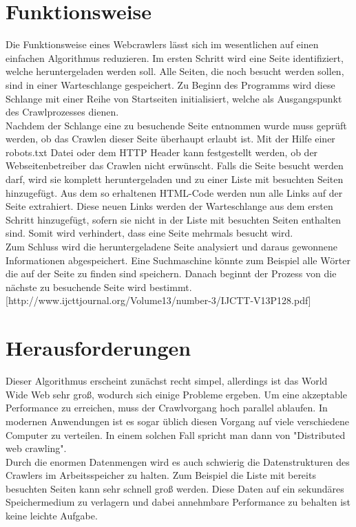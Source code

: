 \section{Funktionsweise}
Die Funktionsweise eines Webcrawlers lässt sich im wesentlichen auf einen einfachen Algorithmus reduzieren. Im ersten Schritt wird eine Seite identifiziert, welche heruntergeladen werden soll. Alle Seiten, die noch besucht werden sollen, sind in einer Warteschlange gespeichert. Zu Beginn des Programms wird diese Schlange mit einer Reihe von Startseiten initialisiert, welche als Ausgangspunkt des Crawlprozesses dienen.\\
Nachdem der Schlange eine zu besuchende Seite entnommen wurde muss geprüft werden, ob das Crawlen dieser Seite überhaupt erlaubt ist. Mit der Hilfe einer robots.txt Datei oder dem HTTP Header kann festgestellt werden, ob der Webseitenbetreiber das Crawlen nicht erwünscht.
Falls die Seite besucht werden darf, wird sie komplett heruntergeladen und zu einer Liste mit besuchten Seiten hinzugefügt. Aus dem so erhaltenen HTML-Code werden nun alle Links auf der Seite extrahiert. Diese neuen Links werden der Warteschlange aus dem ersten Schritt hinzugefügt, sofern sie nicht in der Liste mit besuchten Seiten enthalten sind. Somit wird verhindert, dass eine Seite mehrmals besucht wird. \\
Zum Schluss wird die heruntergeladene Seite analysiert und daraus gewonnene Informationen abgespeichert. Eine Suchmaschine könnte zum Beispiel alle Wörter die auf der Seite zu finden sind speichern. Danach beginnt der Prozess von die nächste zu besuchende Seite wird bestimmt. [http://www.ijcttjournal.org/Volume13/number-3/IJCTT-V13P128.pdf]
\section{Herausforderungen}
Dieser Algorithmus erscheint zunächst recht simpel, allerdings ist das World Wide Web sehr groß, wodurch sich einige Probleme ergeben. %
Um eine akzeptable Performance zu erreichen, muss der Crawlvorgang hoch parallel ablaufen. In modernen Anwendungen ist es sogar üblich diesen Vorgang auf viele verschiedene Computer zu verteilen. In einem solchen Fall spricht man dann von "Distributed web crawling". \\
Durch die enormen Datenmengen wird es auch schwierig die Datenstrukturen des Crawlers im Arbeitsspeicher zu halten. Zum Beispiel die Liste mit bereits besuchten Seiten kann sehr schnell groß werden. Diese Daten auf ein sekundäres Speichermedium zu verlagern und dabei annehmbare Performance zu behalten ist keine leichte Aufgabe.



